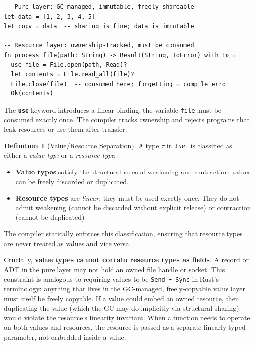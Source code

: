 \documentclass[11pt]{article}
\theoremstyle{definition}
\newtheorem{definition}[theorem]{Definition}
\theoremstyle{remark}
\newcommand{\japl}{\textsc{Japl}}
\newcommand{\keyword}[1]{\texttt{\textbf{#1}}}
\begin{document}
\begin{lstlisting}[caption={The two-layer architecture.}]
-- Pure layer: GC-managed, immutable, freely shareable
let data = [1, 2, 3, 4, 5]
let copy = data  -- sharing is fine; data is immutable

-- Resource layer: ownership-tracked, must be consumed
fn process_file(path: String) -> Result(String, IoError) with Io =
  use file = File.open(path, Read)?
  let contents = File.read_all(file)?
  File.close(file)  -- consumed here; forgetting = compile error
  Ok(contents)
\end{lstlisting}

The \keyword{use} keyword introduces a linear binding: the variable
\texttt{file} must be consumed exactly once.  The compiler tracks
ownership and rejects programs that leak resources or use them after
transfer.

\begin{definition}[Value/Resource Separation]
\label{def:value-resource}
A type $\tau$ in \japl{} is classified as either a \emph{value type}
or a \emph{resource type}:
\begin{itemize}
  \item \textbf{Value types} satisfy the structural rules of
    weakening and contraction: values can be freely discarded or
    duplicated.
  \item \textbf{Resource types} are \emph{linear}: they must be used
    exactly once.  They do not admit weakening (cannot be discarded
    without explicit release) or contraction (cannot be duplicated).
\end{itemize}
The compiler statically enforces this classification, ensuring that
resource types are never treated as values and vice versa.

Crucially, \textbf{value types cannot contain resource types as
fields}.  A record or ADT in the pure layer may not hold an owned
file handle or socket.  This constraint is analogous to requiring
values to be \texttt{Send + Sync} in Rust's terminology: anything
that lives in the GC-managed, freely-copyable value layer must
itself be freely copyable.  If a value could embed an owned resource,
then duplicating the value (which the GC may do implicitly via
structural sharing) would violate the resource's linearity
invariant.  When a function needs to operate on both values and
resources, the resource is passed as a separate linearly-typed
parameter, not embedded inside a value.
\end{definition}
\end{document}
